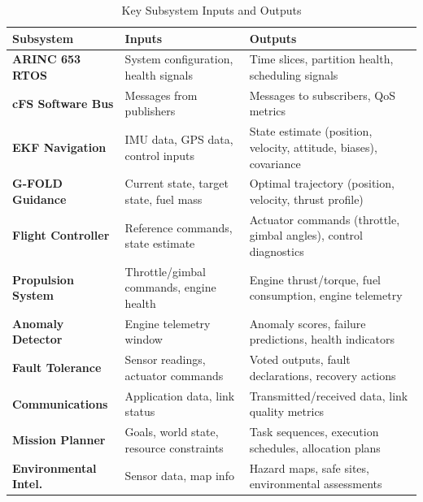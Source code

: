\documentclass[10pt, conference, compsocconf]{IEEEtran}
\begin{document}
\begin{table}[htbp]
\caption{Key Subsystem Inputs and Outputs}
\label{tab:subsystem_interfaces}
\centering
\footnotesize
\begin{tabular}{>{\bfseries}p{3.2cm} p{6.4cm} p{6.4cm}}
\toprule
\textbf{Subsystem} & \textbf{Inputs} & \textbf{Outputs} \\
\midrule
ARINC 653 RTOS        & System configuration, health signals                          & Time slices, partition health, scheduling signals \\[3pt]
cFS Software Bus      & Messages from publishers                                      & Messages to subscribers, QoS metrics \\[3pt]
EKF Navigation        & IMU data, GPS data, control inputs                            & State estimate (position, velocity, attitude, biases), covariance \\[3pt]
G-FOLD Guidance       & Current state, target state, fuel mass                        & Optimal trajectory (position, velocity, thrust profile) \\[3pt]
Flight Controller     & Reference commands, state estimate                            & Actuator commands (throttle, gimbal angles), control diagnostics \\[3pt]
Propulsion System     & Throttle/gimbal commands, engine health                       & Engine thrust/torque, fuel consumption, engine telemetry \\[3pt]
Anomaly Detector      & Engine telemetry window                                       & Anomaly scores, failure predictions, health indicators \\[3pt]
Fault Tolerance       & Sensor readings, actuator commands                            & Voted outputs, fault declarations, recovery actions \\[3pt]
Communications        & Application data, link status                                 & Transmitted/received data, link quality metrics \\[3pt]
Mission Planner       & Goals, world state, resource constraints                      & Task sequences, execution schedules, allocation plans \\[3pt]
Environmental Intel.  & Sensor data, map info                                         & Hazard maps, safe sites, environmental assessments \\
\bottomrule
\end{tabular}
\end{table}
\end{document}
